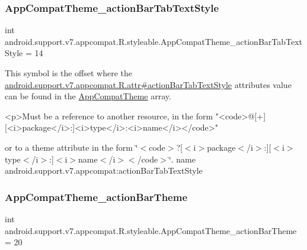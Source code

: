 \subsubsection{\texorpdfstring{App\+Compat\+Theme\+\_\+action\+Bar\+Tab\+Text\+Style}{AppCompatTheme\_actionBarTabTextStyle}}
{\footnotesize\ttfamily int android.\+support.\+v7.\+appcompat.\+R.\+styleable.\+App\+Compat\+Theme\+\_\+action\+Bar\+Tab\+Text\+Style = 14\hspace{0.3cm}{\ttfamily [static]}}

This symbol is the offset where the \hyperlink{classandroid_1_1support_1_1v7_1_1appcompat_1_1R_1_1attr_aba611b517de855c7a18d3a60783bfa3a}{android.\+support.\+v7.\+appcompat.\+R.\+attr\#action\+Bar\+Tab\+Text\+Style} attribute\textquotesingle{}s value can be found in the \hyperlink{classandroid_1_1support_1_1v7_1_1appcompat_1_1R_1_1styleable_a5c42f89e8a410c323be34208d75c430b}{App\+Compat\+Theme} array.

\begin{DoxyVerb}      <p>Must be a reference to another resource, in the form "<code>@[+][<i>package</i>:]<i>type</i>:<i>name</i></code>"
\end{DoxyVerb}
 or to a theme attribute in the form \char`\"{}$<$code$>$?\mbox{[}$<$i$>$package$<$/i$>$\+:\mbox{]}\mbox{[}$<$i$>$type$<$/i$>$\+:\mbox{]}$<$i$>$name$<$/i$>$$<$/code$>$\char`\"{}.  name android.\+support.\+v7.\+appcompat\+:action\+Bar\+Tab\+Text\+Style \mbox{\label{classandroid_1_1support_1_1v7_1_1appcompat_1_1R_1_1styleable_ad2fa65ea8877e20263573e6421d9984a}} 
\subsubsection{\texorpdfstring{App\+Compat\+Theme\+\_\+action\+Bar\+Theme}{AppCompatTheme\_actionBarTheme}}
{\footnotesize\ttfamily int android.\+support.\+v7.\+appcompat.\+R.\+styleable.\+App\+Compat\+Theme\+\_\+action\+Bar\+Theme = 20\hspace{0.3cm}{\ttfamily [static]}}

